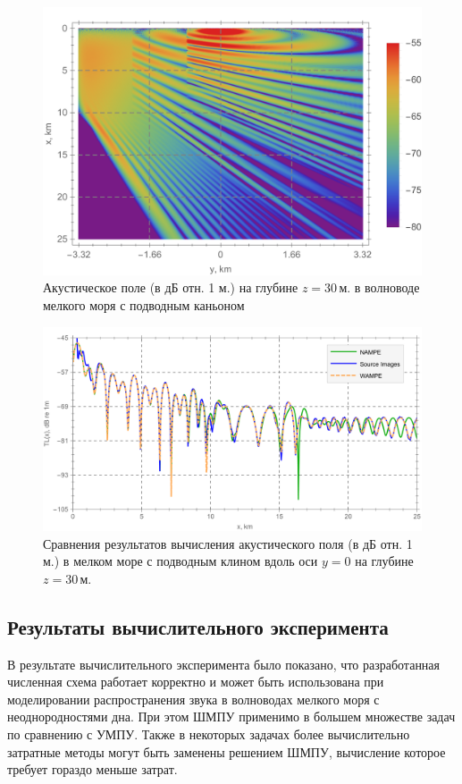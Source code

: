 \documentclass{fefu}
\begin{document}
                \begin{figure}[H]
                    \centering
                    \includegraphics[width=0.49\linewidth]{wedge_field}
                    \caption{\label{fig::wedge_field}Акустическое поле (в дБ отн. 1 м.) на глубине $z=30\,\text{м.}$ в волноводе мелкого моря с подводным каньоном}
                \end{figure}
                \begin{figure}[H]
                    \centering
                    \includegraphics[width=\linewidth]{wedge_comp}
                    \caption{\label{fig::wedge_comp}Сравнения результатов вычисления акустического поля (в дБ отн. 1 м.) в мелком море с подводным клином вдоль оси $y=0$ на глубине $z=30\,\text{м.}$}
                \end{figure}
        \subsection{Результаты вычислительного эксперимента}
            \par В результате вычислительного эксперимента было показано, что разработанная численная схема работает корректно и может быть использована при моделировании распространения звука в волноводах мелкого моря с неоднородностями дна. При этом ШМПУ применимо в большем множестве задач по сравнению с УМПУ. Также в некоторых задачах более вычислительно затратные методы могут быть заменены решением ШМПУ, вычисление которое требует гораздо меньше затрат.
\end{document}
